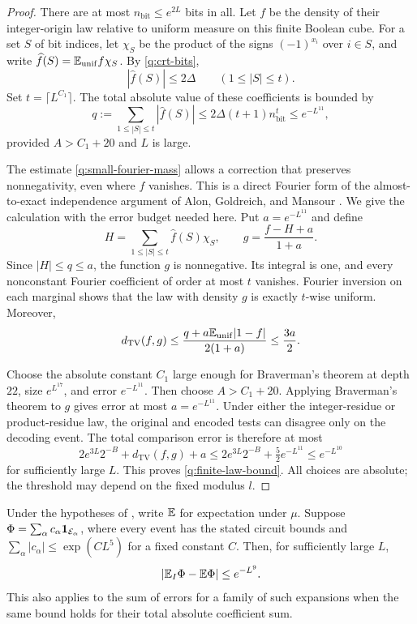 \begin{proof}
There are at most $n_{\mathrm{bit}}\le e^{2L}$ bits in all.
Let $f$ be the density of their integer-origin law relative to
uniform measure on this finite Boolean cube.  For a set $S$ of bit
indices, let $\chi_S$ be the product of the signs $(-1)^{x_i}$ over
$i\in S$, and write $\widehat f(S)=\mathbb E_{\mathrm{unif}}f\chi_S$.
By \eqref{q:crt-bits},
\[
                  |\widehat f(S)|\le2\Delta
       \qquad(1\le |S|\le t).
\]
Set $t=\lceil L^{C_1}\rceil$.  The total absolute value of these
coefficients is bounded by
\begin{equation}\label{q:small-fourier-mass}
 q:=\sum_{1\le|S|\le t}|\widehat f(S)|
 \le 2\Delta(t+1)n_{\mathrm{bit}}^t
 \le e^{-L^{11}},
\end{equation}
provided $A>C_1+20$ and $L$ is large.

The estimate \eqref{q:small-fourier-mass} allows a correction that
preserves nonnegativity, even where $f$ vanishes.  This is a direct
Fourier form of the almost-to-exact independence argument of Alon,
Goldreich, and Mansour \cite[Theorem~2.1 and Section~3.1]{AGM03}.
We give the calculation with the error budget needed here.
Put $a=e^{-L^{11}}$
and define
\[
 H=\sum_{1\le|S|\le t}\widehat f(S)\chi_S,
 \qquad g=\frac{f-H+a}{1+a}.
\]
Since $|H|\le q\le a$, the function $g$ is nonnegative.  Its integral
is one, and every nonconstant Fourier coefficient of order at most
$t$ vanishes.  Fourier inversion on each marginal shows that the
law with density $g$ is exactly $t$-wise uniform.  Moreover,
\begin{equation}\label{q:fourier-correction-tv}
 d_{\mathrm{TV}}(f,g)
 \le\frac{q+a\mathbb E_{\mathrm{unif}}|1-f|}{2(1+a)}
 \le\frac{3a}{2}.
\end{equation}

Choose the absolute constant $C_1$ large enough for Braverman's
theorem at depth $22$, size $e^{L^{17}}$, and error $e^{-L^{11}}$.
Then choose $A>C_1+20$. Applying Braverman's theorem to $g$ gives
error at most $a=e^{-L^{11}}$. Under either the integer-residue or
product-residue law, the original and encoded tests can disagree only
on the decoding event. The total comparison error is therefore at most
\[
 2e^{3L}2^{-B}+d_{\mathrm{TV}}(f,g)+a
 \le 2e^{3L}2^{-B}+\tfrac52e^{-L^{11}}
 \le e^{-L^{10}}
\]
for sufficiently large $L$. This proves \eqref{q:finite-law-bound}.
All choices are absolute; the threshold may depend on the fixed modulus
$l$.
\end{proof}

\begin{corollary}\label{q:finite-expansion}
Under the hypotheses of , write $\mathbb E$ for
expectation under $\mu$.  Suppose
$\Phi=\sum_\alpha c_\alpha\mathbf 1_{\mathcal E_\alpha}$, where every event
has the stated circuit bounds and
$\sum_\alpha|c_\alpha|\le\exp(C L^5)$ for a fixed constant $C$.
Then, for sufficiently large $L$,
\begin{equation}\label{q:scalar-comparison}
                 |\mathbb E_I\Phi-\mathbb E\Phi|\le e^{-L^9}.
\end{equation}
This also applies to the sum of errors for a family of such expansions
when the same bound holds for their total absolute coefficient sum.
\end{corollary}

